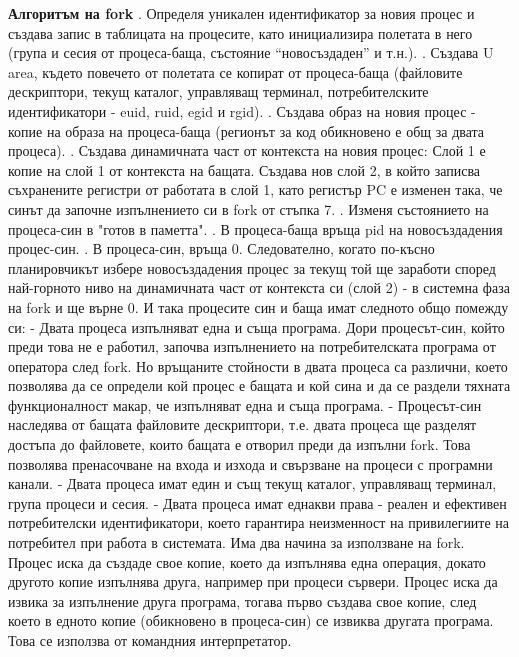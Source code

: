 \documentclass{article}
\begin{document}
\textbf{Алгоритъм на fork} \newline{}. Определя уникален идентификатор за новия процес и създава запис в таблицата на процесите, като инициализира полетата в него
(група и сесия от процеса-баща, състояние “новосъздаден” и т.н.). . Създава U area, където повечето от полетата се копират от процеса-баща (файловите дескриптори, текущ каталог, управляващ
терминал, потребителските идентификатори - euid, ruid, egid и rgid). . Създава образ на новия процес - копие на образа на процеса-баща (регионът за код обикновено е общ за двата процеса). . Създава динамичната част от контекста на новия процес: Слой 1 е копие на слой 1 от контекста на бащата. Създава нов слой 2,
в който записва съхранените регистри от работата в слой 1, като регистър PC е изменен така, че синът да започне изпълнението си
в fork от стъпка 7. . Изменя състоянието на процеса-син в "готов в паметта". . В процеса-баща връща pid на новосъздадения процес-син. . В процеса-син, връща 0. \newline\newline
Следователно, когато по-късно планировчикът избере новосъздадения процес за текущ той ще заработи според най-горното ниво на
динамичната част от контекста си (слой 2) - в системна фаза на fork и ще върне 0.
И така процесите син и баща имат следното общо помежду си:
- Двата процеса изпълняват една и съща програма. Дори процесът-син, който преди това не е работил, започва изпълнението на
потребителската програма от оператора след fork. Но връщаните стойности в двата процеса са различни, което позволява да се
определи кой процес е бащата и кой сина и да се раздели тяхната функционалност макар, че изпълняват една и съща програма.
- Процесът-син наследява от бащата файловите дескриптори, т.е. двата процеса ще разделят достъпа до файловете, които бащата е
отворил преди да изпълни fork. Това позволява пренасочване на входа и изхода и свързване на процеси с програмни канали.
- Двата процеса имат един и същ текущ каталог, управляващ терминал, група процеси и сесия.
- Двата процеса имат еднакви права - реален и ефективен потребителски идентификатори, което гарантира неизменност на привилегиите
на потребител при работа в системата. \newline
Има два начина за използване на fork. Процес иска да създаде свое копие, което да изпълнява една операция, докато другото копие
изпълнява друга, например при процеси сървери. Процес иска да извика за изпълнение друга програма, тогава първо създава свое копие,
след което в едното копие (обикновено в процеса-син) се извиква другата програма. Това се използва от командния интерпретатор.
\end{document}
